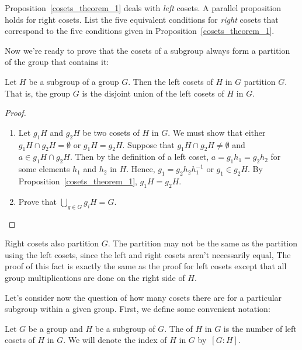 \begin{exercise}{}
Proposition~\ref{cosets_theorem_1} deals with \emph{left} cosets. A parallel proposition holds for right cosets. List the five equivalent conditions for \emph{right} cosets that correspond to the five conditions given in Proposition~\ref{cosets_theorem_1}.
\end{exercise}

Now we're ready to prove that the cosets of a subgroup always form a partition of the group that contains it:

\begin{thm}\label{cosets_theorem_2}
Let $H$ be a subgroup of a group $G$.  Then the left cosets of $H$ in $G$ partition $G$.  That is, the group $G$ is the disjoint union of the left cosets of $H$ in $G$. 
\end{thm}

\begin{proof}
\begin{enumerate}[(1)]
\item
Let $g_1 H$ and $g_2 H$ be two cosets of $H$ in $G$.  We must show that either $g_1 H \cap g_2 H = \emptyset$ or $g_1 H = g_2 H$.  Suppose that $g_1 H \cap g_2 H \neq \emptyset$ and $a \in g_1 H \cap g_2 H$.  Then by the definition of a left coset, $a = g_1 h_1 = g_2 h_2$ for some elements $h_1$ and $h_2$ in $H$.  Hence, $g_1 = g_2 h_2 h_1^{-1}$ or $g_1 \in g_2 H$.  By Proposition~\ref{cosets_theorem_1}, $g_1 H = g_2 H$. 
\item
\begin{exercise}{}
Prove that $\bigcup_{g \in G} g_i H = G$.
\end{exercise}
\end{enumerate}
\end{proof}

\begin{rem}\label{right_is_left}
Right cosets also partition $G$. The partition may not be the same as the partition using the left cosets, since the left and right cosets aren't necessarily equal, 
The proof of this fact is exactly the same as the proof for left cosets except that all group multiplications are done on the right side of $H$.
\end{rem} 

Let's consider now the question of how many cosets there are for a particular subgroup within a given group. First, we define some convenient notation:

\begin{defn}\label{cosets_index}
Let $G$ be a group and $H$ be a subgroup of $G$.  The  of $H$ in $G$ is the number of left cosets of $H$ in $G$.  We will denote the index of $H$ in $G$  by~$[G:H]$\label{indexofasubgroup}.
\end{defn}  

